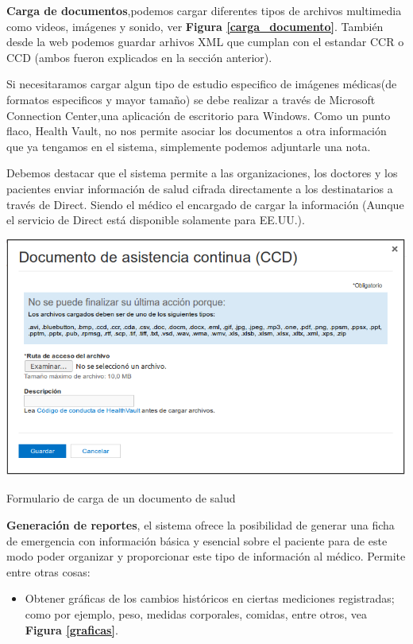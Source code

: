 \begin{itemize}
{\item \textbf{Carga de documentos},podemos cargar diferentes tipos de archivos multimedia como videos, imágenes y sonido, ver \textbf{Figura \ref{carga_documento}}. 
También desde la web podemos guardar arhivos XML que cumplan con el estandar CCR o CCD (ambos fueron explicados en la sección anterior).

Si necesitaramos cargar algun tipo de estudio especifico de imágenes médicas(de formatos especificos y mayor tamaño) se debe realizar a través de Microsoft Connection Center,una aplicación de escritorio para Windows. Como un punto flaco, Health Vault, no nos permite asociar los documentos a otra información que ya tengamos en el sistema, simplemente podemos adjuntarle una nota.

	Debemos destacar que el sistema permite a las organizaciones, los doctores y los pacientes enviar información de salud cifrada directamente a los destinatarios a través de Direct. 
    Siendo el médico el encargado de cargar la información (Aunque el servicio de Direct está disponible solamente para EE.UU.).%
}	
    \begin{correccionFigure}[h]
      \centering
      \includegraphics[width=.8\textwidth]{img/tp1/3-carga_documento}
      \caption{Formulario de carga de un documento de salud}
      \label{carga_documento}
    \end{correccionFigure} 
 {\correccionTexto
\item \textbf{Generación de reportes}, el sistema ofrece la posibilidad de generar una ficha de emergencia  con información básica y esencial sobre el paciente para de este modo poder organizar y proporcionar este tipo de información al médico. Permite entre otras cosas:
	\begin{itemize}
		\item Obtener gráficas de los cambios históricos en ciertas mediciones registradas; como por ejemplo, peso, medidas corporales, comidas, entre otros, vea \textbf{Figura \ref{graficas}}.

\end{itemize}}
\end{itemize}
